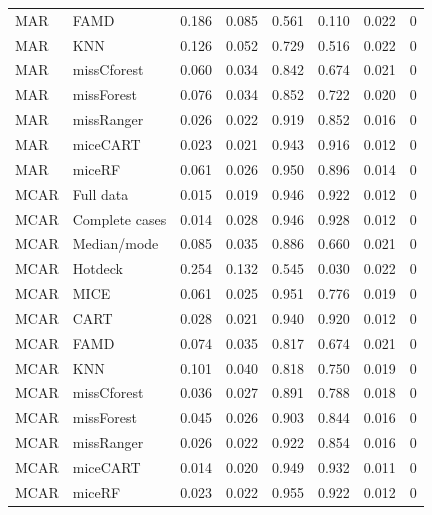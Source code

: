\begin{table}[H]
\begin{tabular}{llrrrrrr}
MAR & FAMD & 0.186 & 0.085 & 0.561 & 0.110 & 0.022 & 0 \\
MAR & KNN & 0.126 & 0.052 & 0.729 & 0.516 & 0.022 & 0 \\
MAR & missCforest & 0.060 & 0.034 & 0.842 & 0.674 & 0.021 & 0 \\
MAR & missForest & 0.076 & 0.034 & 0.852 & 0.722 & 0.020 & 0 \\
MAR & missRanger & 0.026 & 0.022 & 0.919 & 0.852 & 0.016 & 0 \\
MAR & miceCART & 0.023 & 0.021 & 0.943 & 0.916 & 0.012 & 0 \\
MAR & miceRF & 0.061 & 0.026 & 0.950 & 0.896 & 0.014 & 0 \\ \midrule
MCAR & Full data & 0.015 & 0.019 & 0.946 & 0.922 & 0.012 & 0 \\
MCAR & Complete cases & 0.014 & 0.028 & 0.946 & 0.928 & 0.012 & 0 \\
MCAR & Median/mode & 0.085 & 0.035 & 0.886 & 0.660 & 0.021 & 0 \\
MCAR & Hotdeck & 0.254 & 0.132 & 0.545 & 0.030 & 0.022 & 0 \\
MCAR & MICE & 0.061 & 0.025 & 0.951 & 0.776 & 0.019 & 0 \\
MCAR & CART & 0.028 & 0.021 & 0.940 & 0.920 & 0.012 & 0 \\
MCAR & FAMD & 0.074 & 0.035 & 0.817 & 0.674 & 0.021 & 0 \\
MCAR & KNN & 0.101 & 0.040 & 0.818 & 0.750 & 0.019 & 0 \\
MCAR & missCforest & 0.036 & 0.027 & 0.891 & 0.788 & 0.018 & 0 \\
MCAR & missForest & 0.045 & 0.026 & 0.903 & 0.844 & 0.016 & 0 \\
MCAR & missRanger & 0.026 & 0.022 & 0.922 & 0.854 & 0.016 & 0 \\
MCAR & miceCART & 0.014 & 0.020 & 0.949 & 0.932 & 0.011 & 0 \\
MCAR & miceRF & 0.023 & 0.022 & 0.955 & 0.922 & 0.012 & 0 \\
\bottomrule
\end{tabular}
\end{table}
